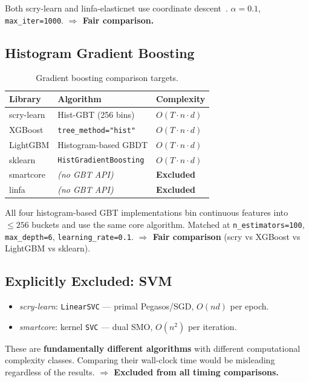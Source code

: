 \documentclass[11pt,a4paper]{article}
\begin{document}
Both scry-learn and linfa-elasticnet use coordinate
descent~\cite{friedman2010}. $\alpha=0.1$, \texttt{max\_iter=1000}.
\textbf{$\Rightarrow$ Fair comparison.}

\subsection{Histogram Gradient Boosting}

\begin{table}[H]
\centering
\caption{Gradient boosting comparison targets.}
\small
\begin{tabular}{lll}
\toprule
\textbf{Library} & \textbf{Algorithm} & \textbf{Complexity} \\
\midrule
scry-learn & Hist-GBT (256 bins) & $O(T \cdot n \cdot d)$ \\
XGBoost & \texttt{tree\_method="hist"} & $O(T \cdot n \cdot d)$ \\
LightGBM & Histogram-based GBDT & $O(T \cdot n \cdot d)$ \\
sklearn & \texttt{HistGradientBoosting} & $O(T \cdot n \cdot d)$ \\
\midrule
smartcore & \textit{(no GBT API)} & \textbf{Excluded} \\
linfa & \textit{(no GBT API)} & \textbf{Excluded} \\
\bottomrule
\end{tabular}
\end{table}

All four histogram-based GBT implementations bin continuous features
into $\leq 256$ buckets and use the same core algorithm. Matched at
\texttt{n\_estimators=100}, \texttt{max\_depth=6},
\texttt{learning\_rate=0.1}.
\textbf{$\Rightarrow$ Fair comparison} (scry vs XGBoost vs LightGBM vs sklearn).

\subsection{Explicitly Excluded: SVM}

\begin{itemize}[nosep]
    \item \textit{scry-learn}: \texttt{LinearSVC} — primal Pegasos/SGD,
          $O(nd)$ per epoch.
    \item \textit{smartcore}: kernel \texttt{SVC} — dual SMO,
          $O(n^2)$ per iteration.
\end{itemize}

These are \textbf{fundamentally different algorithms} with different
computational complexity classes. Comparing their wall-clock time
would be misleading regardless of the results.
\textbf{$\Rightarrow$ Excluded from all timing comparisons.}
\end{document}
